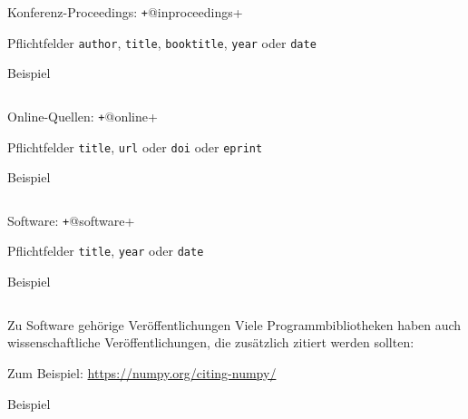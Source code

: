 \begin{frame}[fragile]{Konferenz-Proceedings: \texttt+@inproceedings+}
  \begin{block}{Pflichtfelder}
    \texttt{author}, \hspace{2em}
    \texttt{title}, \hspace{2em}
    \texttt{booktitle}, \hspace{2em}
    \texttt{year} oder \texttt{date}
  \end{block}

  \begin{block}{Beispiel}
    \inputminted[firstline=37, lastline=46]{bibtex}{examples.bib}
  \end{block}
\end{frame}

\begin{frame}[fragile]{Online-Quellen: \texttt+@online+}
  \begin{block}{Pflichtfelder}
    \texttt{title}, \hspace{2em}
    \texttt{url} oder \texttt{doi} oder \texttt{eprint}
  \end{block}

  \begin{block}{Beispiel}
    \inputminted[firstline=48, lastline=54]{bibtex}{examples.bib}
  \end{block}
\end{frame}

\begin{frame}[fragile]{Software: \texttt+@software+}
  \begin{block}{Pflichtfelder}
    \texttt{title}, \hspace{2em}
    \texttt{year} oder \texttt{date}
  \end{block}

  \begin{block}{Beispiel}
    \inputminted[firstline=62, lastline=67]{bibtex}{examples.bib}
  \end{block}
\end{frame}

\begin{frame}[fragile]{Zu Software gehörige Veröffentlichungen}
  Viele Programmbibliotheken haben auch wissenschaftliche Veröffentlichungen,
  die zusätzlich zitiert werden sollten:

  Zum Beispiel: \url{https://numpy.org/citing-numpy/}

  \begin{block}{Beispiel}
    \footnotesize
    \inputminted[firstline=69, lastline=85]{bibtex}{examples.bib}
  \end{block}

\end{frame}

